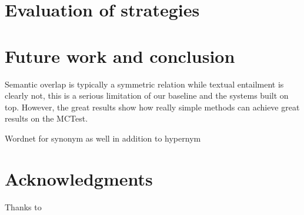 \documentclass[11pt]{article}
\begin{document}
\section{Evaluation of strategies}

\section{Future work and conclusion}

Semantic overlap is typically a symmetric relation while textual entailment is clearly not, this is a serious limitation of our baseline and the systems built on top.
However, the great results show how really simple methods can achieve great results on the MCTest.

Wordnet for synonym as well in addition to hypernym

\section*{Acknowledgments}
Thanks to



\end{document}

